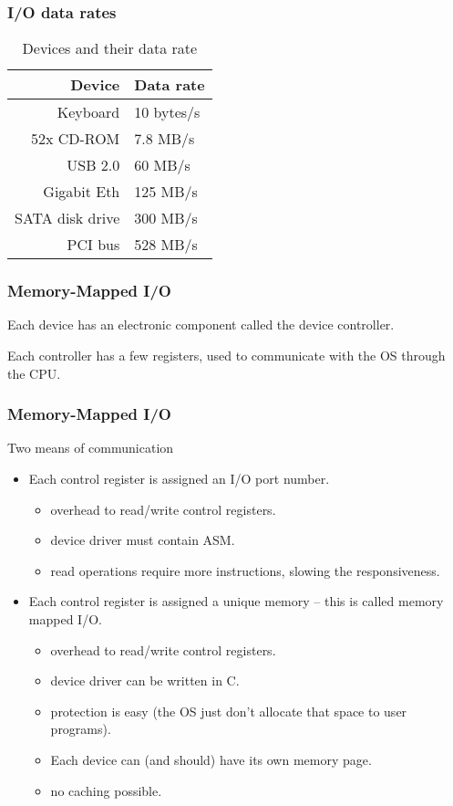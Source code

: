 \begin{frame}
  \frametitle{I/O data rates}
    \begin{center}
      \begin{table}
        \begin{tabular}{ r | l }
          \hline
          Device      & Data rate \\ \hline \hline
          Keyboard    & 10 bytes/s \\ \hline
          52x CD-ROM  & 7.8 MB/s \\ \hline
          USB 2.0     & 60 MB/s \\ \hline
          Gigabit Eth & 125 MB/s \\ \hline
          SATA disk drive & 300 MB/s \\ \hline
          PCI bus     & 528 MB/s \\
          \hline
        \end{tabular}
        \caption{Devices and their data rate}
      \end{table}
    \end{center}
\end{frame}

\begin{frame}
  \frametitle{Memory-Mapped I/O}
  Each device has an electronic component called the device controller.

  Each controller has a few registers, used to communicate with the OS through the CPU.
\end{frame}

\begin{frame}
\frametitle{Memory-Mapped I/O}
  \begin{block}{Two means of communication}
    \begin{itemize}
      \item Each control register is assigned an I/O port number.
    \begin{itemize}
      \item overhead to read/write control registers.
      \item device driver must contain ASM.
      \item read operations require more instructions, slowing the responsiveness.
    \end{itemize}
      \item Each control register is assigned a unique memory -- this is called memory mapped I/O.
      \begin{itemize}
        \item overhead to read/write control registers.
        \item device driver can be written in C.
        \item protection is easy (the OS just don't allocate that space to user programs).
        \item Each device can (and should) have its own memory page.
        \item no caching possible.
      \end{itemize}
    \end{itemize}
  \end{block}
\end{frame}

